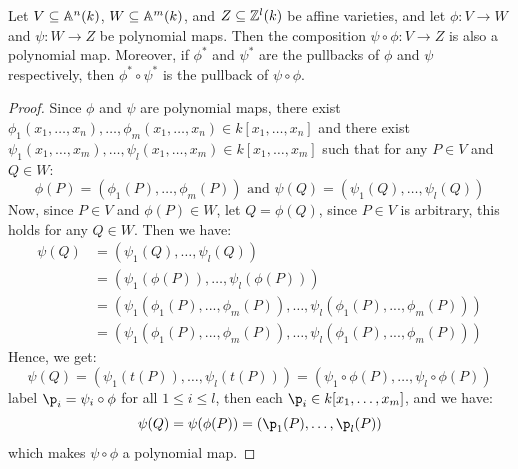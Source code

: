 \begin{proposition}\label{proposition_11.1.7}
  Let $V \subseteq \mathbb{A}^n(k)$, $W \subseteq \mathbb{A}^m(k)$, and $Z \subseteq
  \mathbb{Z}^l(k)$ be affine varieties, and let $\phi:V \xrightarrow{} W$
  and $\psi:W \xrightarrow{} Z$ be polynomial maps. Then the
  composition $\psi \circ \phi:V \xrightarrow{} Z$ is also a
  polynomial map. Moreover, if $\phi^*$ and $\psi^*$ are the
  pullbacks of $\phi$ and $\psi$ respectively, then $\phi^* \circ
  \psi^*$ is the pullback of $\psi \circ \phi$.
\end{proposition}
\begin{proof}
  Since $\phi$ and $\psi$ are polynomial maps, there exist
  $\phi_1(x_1, \dots, x_n), \dots, \phi_m(x_1, \dots, x_n) \in
  k[x_1, \dots, x_n]$ and there exist $\psi_1(x_1, \dots, x_m),
  \dots, \psi_l(x_1, \dots, x_m) \in k[x_1, \dots, x_m]$ such that
  for any $P \in V$ and $Q \in W$:
  \begin{equation*}
    \phi(P)=(\phi_1(P), \dots, \phi_m(P)) \text{ and }
    \psi(Q)=(\psi_1(Q), \dots, \psi_l(Q))
  \end{equation*}
  Now, since $P \in V$ and $\phi(P) \in W$, let $Q=\phi(Q)$, since
  $P \in V$ is arbitrary, this holds for any $Q \in W$. Then we
  have:
  \begin{equation*}
    \begin{split}
    \psi(Q) &=  (\psi_1(Q), \dots, \psi_l(Q)) \\
     &= (\psi_1(\phi(P)), \dots, \psi_l(\phi(P))) \\
     &= (\psi_1(\phi_1(P), ..., \phi_m(P)), \dots,
          \psi_l(\phi_1(P), ..., \phi_m(P))) \\
     &= (\psi_1(\phi_1(P), ..., \phi_m(P)), \dots,
          \psi_l(\phi_1(P), ..., \phi_m(P)))
    \end{split}
  \end{equation*}
  Hence, we get:
  \begin{equation*}
    \psi(Q)=(\psi_1(t(P)), \dots, \psi_l(t(P)))=
    (\psi_1 \circ \phi(P), \dots, \psi_l \circ \phi(P))
  \end{equation*}
  label $\p_i=\psi_i \circ \phi$ for all  $1 \leq i \leq l$, then each
  $\p_i \in k[x_1, \dots, x_m]$, and we have:
  \begin{equation*}
    \psi(Q)=\psi(\phi(P))=(\p_1(P), \dots, \p_l(P))
  \end{equation*}
  which makes $\psi \circ \phi$ a polynomial map.


\end{proof}

